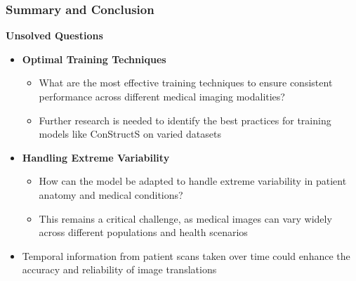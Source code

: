 \documentclass[aspectratio=169, lecture, amberg]{OTHAWbeamer}
\begin{document}
\begin{frame}
        \frametitle{Summary and Conclusion}
        \textbf{Unsolved Questions}
        \vspace{0.2cm}
        \begin{itemize}
            \item <1-> \textbf{Optimal Training Techniques}
            \vspace{0.2cm}
            \begin{itemize}
                \item What are the most effective training techniques to ensure consistent performance across different medical imaging modalities?
                \vspace{0.2cm}
                \item Further research is needed to identify the best practices for training models like ConStructS on varied datasets
                \vspace{0.2cm}
            \end{itemize}
            \item <2-> \textbf{Handling Extreme Variability}
            \vspace{0.2cm}
            \begin{itemize}
                \item How can the model be adapted to handle extreme variability in patient anatomy and medical conditions?
                \vspace{0.2cm}
                \item This remains a critical challenge, as medical images can vary widely across different populations and health scenarios
                \vspace{0.2cm}
            \end{itemize}
            \item <3-> Temporal information from patient scans taken over time could enhance the accuracy and reliability of image translations
            
        \end{itemize}
\end{frame}
\end{document}
